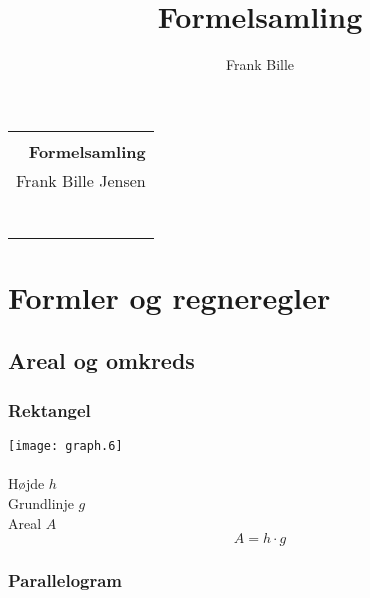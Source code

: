 \documentclass[11pt,a5paper,fleqn,leqno]{book}
\author{Frank Bille}
\title{Formelsamling}
\begin{document}
\setlength{\parindent}{0cm}

\frontmatter

\thispagestyle{empty}
\setlength{\arrayrulewidth}{0.1cm}
\null
\vspace{3cm}
\begin{flushright}
  \begin{tabular}{r|}
    \rule{0pt}{2ex} \\
    \Huge \textsf{\textbf{Formelsamling}}
    \rule{0pt}{4ex} \\
    \large \textsf{Frank Bille Jensen}
    \rule{0pt}{3ex} \\
    \rule{0pt}{3ex} \\
    \rule{0pt}{3ex} \\
    \rule{0pt}{3ex} \\
    \rule{0pt}{3ex} \\
    \rule{0pt}{3ex} \\
    \rule{0pt}{3ex} \\
    \rule{0pt}{3ex} \\
  \end{tabular}
\end{flushright}
\cleardoublepage
\setlength{\arrayrulewidth}{0.4pt}

\tableofcontents

\mainmatter

\pagestyle{headings}

\chapter{Formler og regneregler}

\newpage

\section{Areal og omkreds}

\subsection{Rektangel}

\texttt{[image: graph.6]}
\\
\\
Højde $h$ \\
Grundlinje $g$ \\
Areal $A$
\begin{equation}
A = h \cdot g
\end{equation}

\subsection{Parallelogram}
\end{document}
